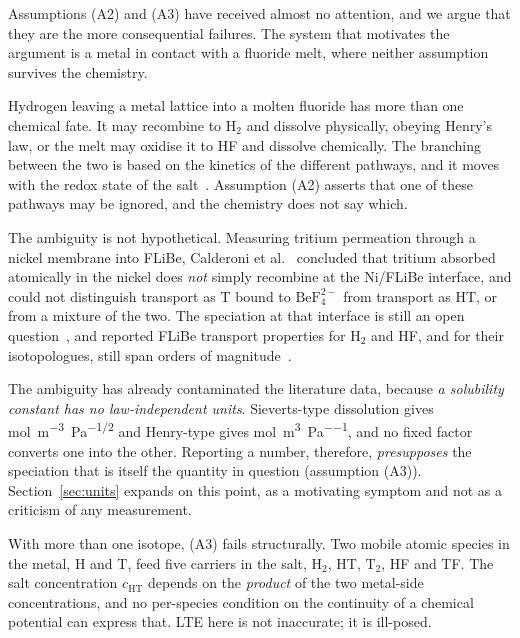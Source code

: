 \documentclass[5p]{elsarticle}
\begin{document}
Assumptions (A2) and (A3) have received almost no attention, and we argue that they are the more consequential failures.
The system that motivates the argument is a metal in contact with a fluoride melt, where neither assumption survives the chemistry.

Hydrogen leaving a metal lattice into a molten fluoride has more than one chemical fate.
It may recombine to $\mathrm{H_2}$ and dissolve physically, obeying Henry's law, or the melt may oxidise it to HF and dissolve chemically.
The branching between the two is based on the kinetics of the different pathways, and it moves with the redox state of the salt~\cite{lam_impact_2021,carotti_electrochemical_2021}.
Assumption (A2) asserts that one of these pathways may be ignored, and the chemistry does not say which.

The ambiguity is not hypothetical.
Measuring tritium permeation through a nickel membrane into FLiBe, Calderoni et al.~\cite{calderoni_measurement_2008} concluded that tritium absorbed atomically in the nickel does \emph{not} simply recombine at the Ni/FLiBe interface, and could not distinguish transport as T bound to $\mathrm{BeF_4^{2-}}$ from transport as HT, or from a mixture of the two.
The speciation at that interface is still an open question~\cite{delaporte-mathurin_baby_2025, delaporte-mathurin_advancing_2024}, and reported FLiBe transport properties for $\mathrm{H_2}$ and HF, and for their isotopologues, still span orders of magnitude~\cite{ferry_libra_2022}.

The ambiguity has already contaminated the literature data, because \emph{a solubility constant has no law-independent units}.
Sieverts-type dissolution gives \unit{\mole\per\cubic\metre\pascal\tothe{-1/2}} and Henry-type gives \unit{\mole\per\cubic\metre\per\pascal}, and no fixed factor converts one into the other.
Reporting a number, therefore, \textit{presupposes} the speciation that is itself the quantity in question (assumption (A3)).
Section~\ref{sec:units} expands on this point, as a motivating symptom and not as a criticism of any measurement.

With more than one isotope, (A3) fails structurally.
Two mobile atomic species in the metal, H and T, feed five carriers in the salt, $\mathrm{H_2}$, HT, $\mathrm{T_2}$, HF and TF. 
The salt concentration $c_\mathrm{HT}$ depends on the \emph{product} of the two metal-side concentrations, and no per-species condition on the continuity of a chemical potential can express that. 
LTE here is not inaccurate; it is ill-posed.
\end{document}
